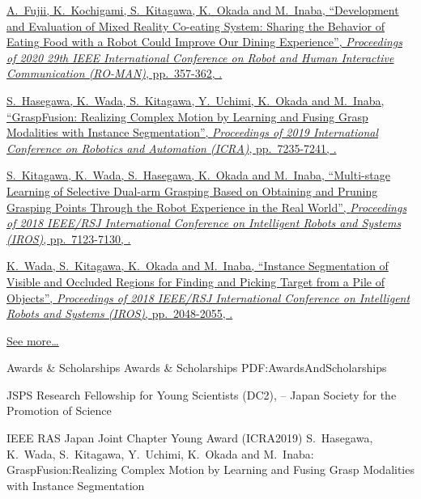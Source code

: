 \documentclass[letterpaper,MMMyyyy,nonstopmode]{simpleresumecv}
\begin{document}
\begin{Body}
\BulletItem
\href{https://doi.org/10.1109/RO-MAN47096.2020.9223518}
{A.~Fujii, K.~Kochigami, \underline{S.~Kitagawa}, K.~Okada and M.~Inaba,
``Development and Evaluation of Mixed Reality Co-eating System: Sharing the Behavior of Eating Food with a Robot Could Improve Our Dining Experience'',
\textit{Proceedings of 2020 29th IEEE International Conference on Robot and Human Interactive Communication (RO-MAN)},
pp.~357-362,
.}

\BulletItem
\href{https://doi.org/10.1109/ICRA.2019.8793710}
{S.~Hasegawa, K.~Wada, \underline{S.~Kitagawa}, Y.~Uchimi, K.~Okada and M.~Inaba,
``GraspFusion: Realizing Complex Motion by Learning and Fusing Grasp Modalities with Instance Segmentation'',
\textit{Proceedings of 2019 International Conference on Robotics and Automation (ICRA)},
pp.~7235-7241,
.}

\BulletItem
\href{https://doi.org/10.1109/IROS.2018.8593752}
{\underline{S.~Kitagawa}, K.~Wada, S.~Hasegawa, K.~Okada and M.~Inaba,
``Multi-stage Learning of Selective Dual-arm Grasping Based on Obtaining and Pruning Grasping Points Through the Robot Experience in the Real World'',
\textit{Proceedings of 2018 IEEE/RSJ International Conference on Intelligent Robots and Systems (IROS)},
pp.~7123-7130,
.}

\BulletItem
\href{https://doi.org/10.1109/IROS.2018.8593690}
{K.~Wada, \underline{S.~Kitagawa}, K.~Okada and M.~Inaba,
``Instance Segmentation of Visible and Occluded Regions for Finding and Picking Target from a Pile of Objects'',
\textit{Proceedings of 2018 IEEE/RSJ International Conference on Intelligent Robots and Systems (IROS)},
pp.~2048-2055,
.}

\hfill
\href{https://scholar.google.com/citations?user=deAeiIkAAAAJ}{\underline{See more…}}

\endgroup


\Section
{Awards \&\newline
Scholarships}
{Awards \& Scholarships}
{PDF:AwardsAndScholarships}

\BulletItem
JSPS Research Fellowship for Young Scientists (DC2),
\hfill
{} --
\newline
Japan Society for the Promotion of Science

 IEEE RAS Japan Joint Chapter Young Award (ICRA2019)
\hfill
{}
\newline
S.~Hasegawa, K.~Wada, S.~Kitagawa, Y.~Uchimi, K.~Okada and M.~Inaba:
GraspFusion:Realizing Complex Motion by Learning and Fusing Grasp Modalities with Instance Segmentation


\end{Body}
\end{document}
